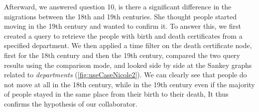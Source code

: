 Afterward, we answered question 10, \ie is there a significant difference in the migrations between the 18th and 19th centuries.
She thought people started moving in the 19th century and wanted to confirm it.
To answer this, we first created a query to retrieve the people with birth and death certificates from a specified department.
We then applied a time filter on the death certificate node, first for the 18th century and then the 19th century, compared the two query results using the comparison mode, and looked side by side at the Sankey graphs related to \textit{departments} (\autoref{fig:useCaseNicole2}).
We can clearly see that people do not move at all in the 18th century, while in the 19th century even if the majority of people stayed in the same place from their birth to their death, 
It thus confirms the hypothesis of our collaborator.

